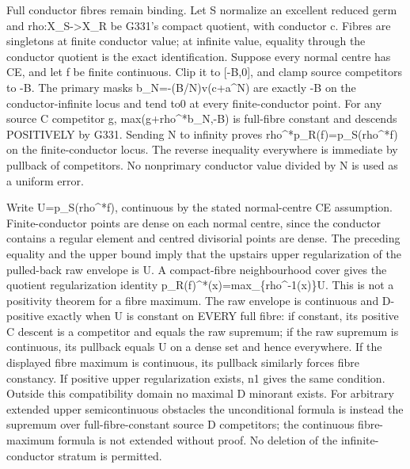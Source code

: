 \documentclass[11pt]{article}
\begin{document}
Full conductor fibres remain binding. Let S normalize an excellent reduced germ and rho:X\_S->X\_R be G331's compact quotient, with conductor c. Fibres are singletons at finite conductor value; at infinite value, equality through the conductor quotient is the exact identification. Suppose every normal centre has CE, and let f be finite continuous. Clip it to [-B,0], and clamp source competitors to -B. The primary masks b\_N=-(B/N)v(c+a\textasciicircum{}N) are exactly -B on the conductor-infinite locus and tend to0 at every finite-conductor point. For any source C competitor g, max(g+rho\textasciicircum{}*b\_N,-B) is full-fibre constant and descends POSITIVELY by G331. Sending N to infinity proves rho\textasciicircum{}*p\_R(f)=p\_S(rho\textasciicircum{}*f) on the finite-conductor locus. The reverse inequality everywhere is immediate by pullback of competitors. No nonprimary conductor value divided by N is used as a uniform error.

Write U=p\_S(rho\textasciicircum{}*f), continuous by the stated normal-centre CE assumption. Finite-conductor points are dense on each normal centre, since the conductor contains a regular element and centred divisorial points are dense. The preceding equality and the upper bound imply that the upstairs upper regularization of the pulled-back raw envelope is U. A compact-fibre neighbourhood cover gives the quotient regularization identity p\_R(f)\textasciicircum{}*(x)=max\_\{rho\textasciicircum{}-1(x)\}U. This is not a positivity theorem for a fibre maximum. The raw envelope is continuous and D-positive exactly when U is constant on EVERY full fibre: if constant, its positive C descent is a competitor and equals the raw supremum; if the raw supremum is continuous, its pullback equals U on a dense set and hence everywhere. If the displayed fibre maximum is continuous, its pullback similarly forces fibre constancy. If positive upper regularization exists, n1 gives the same condition. Outside this compatibility domain no maximal D minorant exists. For arbitrary extended upper semicontinuous obstacles the unconditional formula is instead the supremum over full-fibre-constant source D competitors; the continuous fibre-maximum formula is not extended without proof. No deletion of the infinite-conductor stratum is permitted.
\end{document}
